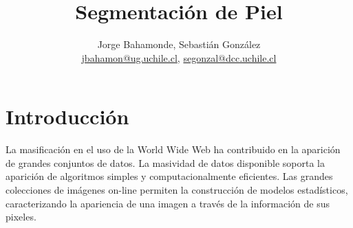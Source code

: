 \documentclass[12pt]{article}
\title{Segmentación de Piel}
\author{Jorge Bahamonde, Sebastián González\\
\small{\url{jbahamon@ug.uchile.cl}, \url{segonzal@dcc.uchile.cl}}}
\date{}
\begin{document}
\maketitle

\section{Introducción}


La masificación en el uso de la World Wide Web ha contribuido en la aparición de
grandes conjuntos de datos. La masividad de datos disponible soporta la aparición de
algoritmos simples y computacionalmente eficientes. Las grandes colecciones de imágenes on-line permiten
la construcción de modelos estadísticos, caracterizando la apariencia de una imagen a través de
la información de sus pixeles.
\end{document}
